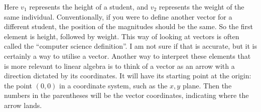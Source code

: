\documentclass[a4,12pt,twosided,openany]{memoir}
\begin{document}
Here  $v_1$ represents the height of a student, and $v_2$ represents the weight of the same individual. Conventionally, if you were to define another vector for a different student, the position of the magnitudes should be the same. So the first element is height, followed by weight. This way of looking at vectors is often called the “computer science definition”. I am not sure if that is accurate, but it is certainly a way to utilise a vector. Another way to interpret these elements that is more relevant to linear algebra is to think of a vector as an arrow with a direction dictated by its coordinates. It will have its starting point at the origin: the point $(0,0)$ in a coordinate system, such as the $x,y$ plane. Then the numbers in the parentheses will be the vector coordinates, indicating where the arrow lands.
\end{document}
